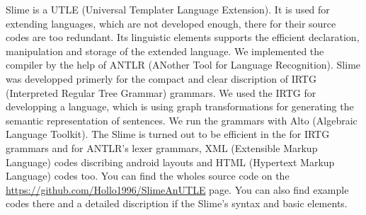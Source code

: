 Slime is a UTLE (Universal Templater Language Extension).
It is used for extending languages, which are not developed enough, there for their source codes are too redundant.
Its linguistic elements supports the efficient declaration, manipulation and storage of the extended language.
We implemented the compiler by the help of ANTLR (ANother Tool for Language Recognition).
Slime was developped primerly for the compact and clear discription of IRTG (Interpreted Regular Tree Grammar) grammars.
We used the IRTG for developping a language, which is using graph transformations for generating the semantic representation of sentences.
We run the grammars with Alto (Algebraic Language Toolkit).
The Slime is turned out to be efficient in the for IRTG grammars and for ANTLR's lexer grammars, XML (Extensible Markup Language) codes discribing android layouts and HTML (Hypertext Markup Language) codes too.
You can find the wholes source code on the \url{https://github.com/Hollo1996/SlimeAnUTLE} page.
You can also find example codes there and a detailed discription if the Slime's syntax and basic elements.


\vfill
\selectthesislanguage

\setcounter{romanPage}{\value{page}}
